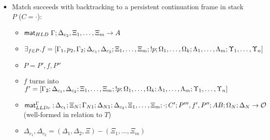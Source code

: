 \begin{lemma}
\begin{itemize}[leftmargin=*]
   \item Match succeeds with backtracking to a persistent continuation frame
   in stack $P$ ($C = \cdot$):
   \begin{itemize}[leftmargin=\secondm]
      \item $\mathsf{mat}_{HLD} \; \Gamma; \Delta_{c_2}, \Xi_1, \dotsc, \Xi_m \rightarrow A$
      \item $\exists_{f \in P}. f = [\Gamma_1, p_2, \Gamma_2; \Delta_{c_1}, \Delta_{c_2};
   \Xi_1, \dotsc, \Xi_m; {!} p; \Omega_1, \dotsc, \Omega_k; \Lambda_1,
   \dotsc, \Lambda_m; \Upsilon_1, \dotsc, \Upsilon_n]$
      \item $P = P', f, P''$
      \item $f$ turns into $f' = [\Gamma_2; \Delta_{c_1},
         \Delta_{c_2}; \Xi_1, \dotsc, \Xi_m; {!} p; \Omega_1, \dotsc,
         \Omega_k; \Lambda_1, \dotsc, \Lambda_m; \Upsilon_1, \dotsc, \Upsilon_n]$
      \item $\mathsf{mat}_{LLDc}^{\Gamma} \;; \Delta_{c_1}; \Xi_N; \Gamma_{N1}; \Delta_{N1};
      \Delta_{c_2}, \Xi_1, \dotsc, \Xi_m; \cdot; C'; P''', f', P'';
      AB; \Omega_N; \Delta_N \rightarrow \mathcal{O}$
      (well-formed in relation to $T$)
      \item $\Delta_{c_1}, \Delta_{c_2} = (\Delta_1, \Delta_2, \Xi) - (\Xi_1, \dotsc,
            \Xi_m)$
   \end{itemize}
   
\end{itemize}
\end{lemma}
